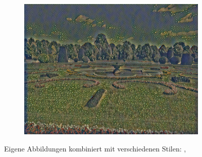 \begin{figure}[H]
\begin{subfigure}[h]{0.32\textwidth}
        \includegraphics[width=\textwidth]{resources/content/experiments/garden-vgg16_portrait_of_joseph_roulin.jpg}
    \end{subfigure}

    \caption{Eigene Abbildungen kombiniert mit verschiedenen Stilen: \cite{crystal_glass_on_a_colorful_background_img}, \cite{portrait_of_joseph_roulin_img}}
    \label{img:trained_models1}
\end{figure}

\pagebreak
{}

